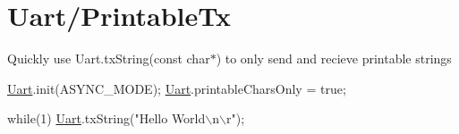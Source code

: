 \hypertarget{a00004}{\section{Uart/\-Printable\-Tx}
}
Quickly use Uart.\-tx\-String(const char$\ast$) to only send and recieve printable strings 
\begin{DoxyCode}
\hyperlink{a00009}{Uart}.init(ASYNC\_MODE); 
\hyperlink{a00009}{Uart}.printableCharsOnly = \textcolor{keyword}{true};

\textcolor{keywordflow}{while}(1) 
 \hyperlink{a00009}{Uart}.txString(\textcolor{stringliteral}{"Hello World\(\backslash\)n\(\backslash\)r"});
\end{DoxyCode}



\begin{DoxyCodeInclude}
\end{DoxyCodeInclude}
 